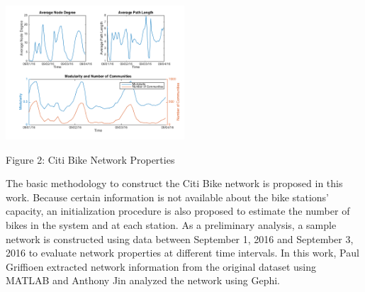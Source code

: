 \documentclass[times, 10pt,twocolumn]{article}
\begin{document}






\centerline{\includegraphics[width=0.5\textwidth]{m2/plotterfigure.png}}
\centerline{Figure 2: Citi Bike Network Properties}

The basic methodology to construct the Citi Bike network is proposed in this work. Because certain information is not available about the bike stations' capacity, an initialization procedure is also proposed to estimate the number of bikes in the system and at each station. As a preliminary analysis, a sample network is constructed using data between September 1, 2016 and September 3, 2016 to evaluate network properties at different time intervals. In this work, Paul Griffioen extracted network information from the original dataset using MATLAB and Anthony Jin analyzed the network using Gephi.
\end{document}
